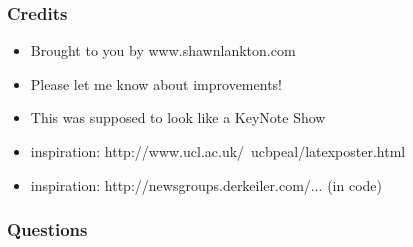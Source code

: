 \documentclass[serif,mathserif]{beamer}
\begin{document}

\begin{frame}
  \frametitle{Credits}
  \begin{itemize}
  \item Brought to you by www.shawnlankton.com
  \item Please let me know about improvements!
  \item This was supposed to look like a KeyNote Show
  \item inspiration: http://www.ucl.ac.uk/~ucbpeal/latexposter.html
  \item inspiration: http://newsgroups.derkeiler.com/... (in code)
  \end{itemize}
\end{frame}

\begin{frame}
  \frametitle{Questions}
\end{frame}
\end{document}
